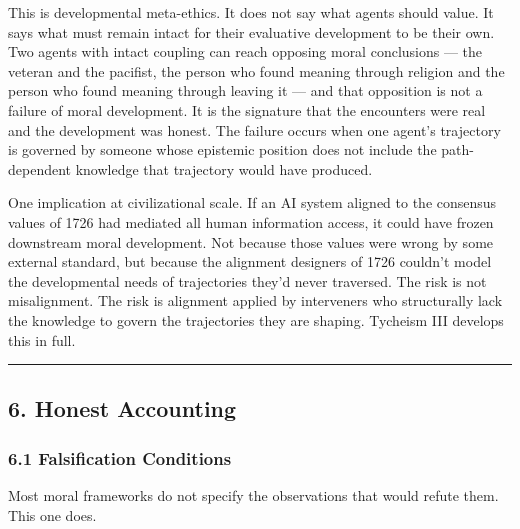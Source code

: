 \documentclass[
]{article}
\begin{document}
This is developmental meta-ethics. It does not say what agents should
value. It says what must remain intact for their evaluative development
to be their own. Two agents with intact coupling can reach opposing
moral conclusions --- the veteran and the pacifist, the person who found
meaning through religion and the person who found meaning through
leaving it --- and that opposition is not a failure of moral
development. It is the signature that the encounters were real and the
development was honest. The failure occurs when one agent's trajectory
is governed by someone whose epistemic position does not include the
path-dependent knowledge that trajectory would have produced.

One implication at civilizational scale. If an AI system aligned to the
consensus values of 1726 had mediated all human information access, it
could have frozen downstream moral development. Not because those values
were wrong by some external standard, but because the alignment
designers of 1726 couldn't model the developmental needs of trajectories
they'd never traversed. The risk is not misalignment. The risk is
alignment applied by interveners who structurally lack the knowledge to
govern the trajectories they are shaping. Tycheism III develops this in
full.

\begin{center}\rule{0.5\linewidth}{0.5pt}\end{center}

\subsection{6. Honest Accounting}\label{honest-accounting}

\subsubsection{6.1 Falsification
Conditions}\label{falsification-conditions}

Most moral frameworks do not specify the observations that would refute
them. This one does.
\end{document}
